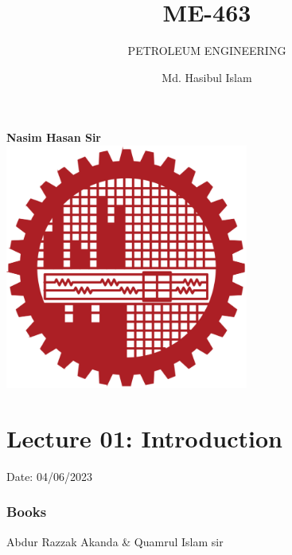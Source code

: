 \documentclass{article}
\title{ME-463}
\author{Md. Hasibul Islam}
\subtitle{PETROLEUM ENGINEERING}
\begin{document}
\begin{titlepage}
    \centering
    
    {\Huge\bfseries\maketitle}
    \textbf{Nasim Hasan Sir} \\
    \vspace{2cm}
    \includegraphics[width=8cm]{institution_logo.jpg}
    \vfill
\end{titlepage}

\tableofcontents
\pagebreak

\section{Lecture 01: Introduction} 
\hfill Date: 04/06/2023

\subsubsection*{Books}
Abdur Razzak Akanda \& Quamrul Islam sir
\end{document}
